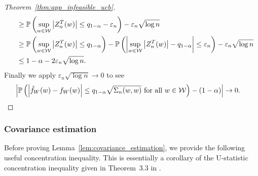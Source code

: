 \begin{proof}[Theorem~\ref{thm:app_infeasible_ucb}]
\begin{align*}
    &\quad\geq
    \mathbb{P}\left(
      \sup_{w \in \mathcal{W}}
      \left| Z_n^T(w) \right|
      \leq
      q_{1-\alpha}
      - \varepsilon_n
    \right)
    - \varepsilon_n \sqrt{\log n} \\
    &\quad\geq
    \mathbb{P}\left(
      \sup_{w \in \mathcal{W}}
      \left|
      Z_n^T(w)
      \right|
      \leq
      q_{1-\alpha}
    \right)
    - \mathbb{P}\left(
      \left|
      \sup_{w \in \mathcal{W}}
      \big| Z_n^T(w) \big|
      - q_{1-\alpha}
      \right|
      \leq \varepsilon_n
    \right)
    - \varepsilon_n \sqrt{\log n} \\
    &\quad\leq
    1 - \alpha
    - 2 \varepsilon_n \sqrt{\log n}.
  \end{align*}
  Finally we apply $\varepsilon_n \sqrt{\log n} \to 0$
  to see
  \begin{align*}
    \left|
    \mathbb{P}\left(
      \left|
      \hat f_W(w) - f_W(w)
      \right|
      \leq
      q_{1-\alpha}
      \sqrt{\Sigma_n(w,w)}
      \textup{ for all }
      w \in \mathcal{W}
    \right)
    - (1 - \alpha)
    \right|
    &\to 0.
  \end{align*}
\end{proof}

\subsubsection{Covariance estimation}

Before proving
Lemma~\ref{lem:covariance_estimation},
we provide the following useful
concentration inequality.
This is essentially a corollary of the
U-statistic concentration inequality given in
Theorem~3.3 in \citet{gine2000exponential}.

